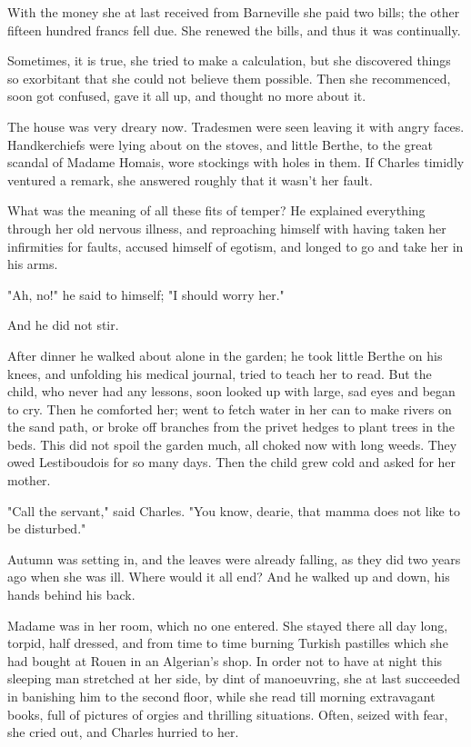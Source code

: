 \documentclass{tufte-book}
\begin{document}
With the money she at last received from Barneville she paid two bills;
the other fifteen hundred francs fell due. She renewed the bills, and
thus it was continually.

Sometimes, it is true, she tried to make a calculation, but she
discovered things so exorbitant that she could not believe them
possible. Then she recommenced, soon got confused, gave it all up, and
thought no more about it.

The house was very dreary now. Tradesmen were seen leaving it with angry
faces. Handkerchiefs were lying about on the stoves, and little Berthe,
to the great scandal of Madame Homais, wore stockings with holes in
them. If Charles timidly ventured a remark, she answered roughly that it
wasn't her fault.

What was the meaning of all these fits of temper? He explained
everything through her old nervous illness, and reproaching himself with
having taken her infirmities for faults, accused himself of egotism, and
longed to go and take her in his arms.

"Ah, no!" he said to himself; "I should worry her."

And he did not stir.

After dinner he walked about alone in the garden; he took little Berthe
on his knees, and unfolding his medical journal, tried to teach her
to read. But the child, who never had any lessons, soon looked up with
large, sad eyes and began to cry. Then he comforted her; went to fetch
water in her can to make rivers on the sand path, or broke off branches
from the privet hedges to plant trees in the beds. This did not spoil
the garden much, all choked now with long weeds. They owed Lestiboudois
for so many days. Then the child grew cold and asked for her mother.

"Call the servant," said Charles. "You know, dearie, that mamma does not
like to be disturbed."

Autumn was setting in, and the leaves were already falling, as they did
two years ago when she was ill. Where would it all end? And he walked up
and down, his hands behind his back.

Madame was in her room, which no one entered. She stayed there all
day long, torpid, half dressed, and from time to time burning Turkish
pastilles which she had bought at Rouen in an Algerian's shop. In order
not to have at night this sleeping man stretched at her side, by dint of
manoeuvring, she at last succeeded in banishing him to the second floor,
while she read till morning extravagant books, full of pictures of
orgies and thrilling situations. Often, seized with fear, she cried out,
and Charles hurried to her.
\end{document}
